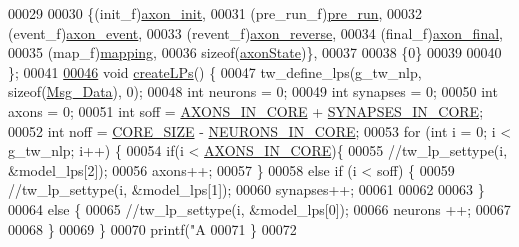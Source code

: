\begin{DoxyCode}
00029 
00030                          \{(init\_f)\hyperlink{model__main_8c_aa1b78ccf8fb2ff34c960d4c55576c714}{axon\_init},
00031                           (pre\_run\_f)\hyperlink{model__main_8c_a7a8df3f99e1d582c6c136b16d6e34d13}{pre\_run},
00032                           (event\_f)\hyperlink{model__main_8c_a8fae0a84a982a733de15203fd551e6db}{axon\_event},
00033                           (revent\_f)\hyperlink{model__main_8c_a76fff63b340bdcd9b63c490e67797178}{axon\_reverse},
00034                           (final\_f)\hyperlink{model__main_8c_a9f5c1071ccef11cdc8027264fca860c7}{axon\_final},
00035                           (map\_f)\hyperlink{model__main_8c_a9397f1f0e189cd7dac262423993811e4}{mapping},
00036                           \textcolor{keyword}{sizeof}(\hyperlink{structaxon_state}{axonState})\},
00037 
00038                          \{0\}
00039 
00040 \};
00041 
\hypertarget{model__main_8c_source_l00046}{}\hyperlink{model__main_8h_a614c89653e656c2b0436bed7f2c8de3e}{00046} \textcolor{keywordtype}{void} \hyperlink{model__main_8c_a614c89653e656c2b0436bed7f2c8de3e}{createLPs}() \{
00047   tw\_define\_lps(g\_tw\_nlp, \textcolor{keyword}{sizeof}(\hyperlink{struct_msg___data}{Msg\_Data}), 0);
00048     \textcolor{keywordtype}{int} neurons = 0;
00049     \textcolor{keywordtype}{int} synapses = 0;
00050     \textcolor{keywordtype}{int} axons = 0;
00051     \textcolor{keywordtype}{int} soff = \hyperlink{assist_8h_a519a06367b2b3f793c56d3ab78f5b2ef}{AXONS\_IN\_CORE} + \hyperlink{assist_8h_a076b99099b46431255982b2bb8ce06fb}{SYNAPSES\_IN\_CORE};
00052     \textcolor{keywordtype}{int} noff = \hyperlink{assist_8h_ad39b86a0b748731175572436f6672264}{CORE\_SIZE} - \hyperlink{assist_8h_a67e8e45768f76b984a60fcff2b7c51aa}{NEURONS\_IN\_CORE};
00053   \textcolor{keywordflow}{for} (\textcolor{keywordtype}{int} i = 0; i < g\_tw\_nlp; i++) \{
00054       \textcolor{keywordflow}{if}(i < \hyperlink{assist_8h_a519a06367b2b3f793c56d3ab78f5b2ef}{AXONS\_IN\_CORE})\{
00055               \textcolor{comment}{//tw\_lp\_settype(i, &model\_lps[2]);}
00056           axons++;
00057       \}
00058       \textcolor{keywordflow}{else} \textcolor{keywordflow}{if} (i < soff) \{
00059               \textcolor{comment}{//tw\_lp\_settype(i, &model\_lps[1]);}
00060           synapses++;
00061 
00062 
00063       \}
00064       \textcolor{keywordflow}{else} \{
00065               \textcolor{comment}{//tw\_lp\_settype(i, &model\_lps[0]);}
00066           neurons ++;
00067 
00068       \}
00069   \}
00070     printf(\textcolor{stringliteral}{"A %
00071 \}
00072 
}
\end{DoxyCode}
